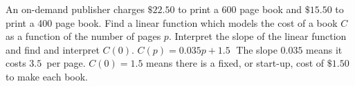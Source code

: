 {An on-demand publisher charges $\$22.50$ to print a 600 page book and $\$15.50$ to print a 400 page book.  Find a linear function which models the cost of a book $C$ as a function of the number of pages $p$.  Interpret the slope of the linear function and find and interpret $C(0)$.}
{ $C(p) = 0.035p + 1.5 \;$  The slope $0.035$ means it costs $3.5$\textcent \, per page.  $C(0) = 1.5$ means there is a fixed, or start-up, cost of $\$1.50$ to make each book.}